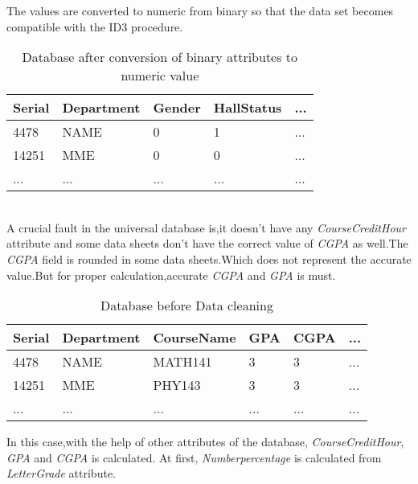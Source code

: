 The values are converted to numeric  from binary so that the data set becomes compatible with the ID3 procedure.
\begin {table}[H]
\caption {Database after conversion of binary attributes to numeric value} \label{tab:title}
\begin{center}
\begin{tabular}{ | m{1cm} |  m{2cm} | m{2cm} | m{2cm} |  m{0.5cm} | } 
\hline
Serial & Department &  Gender & HallStatus & ... \\ 
\hline
4478 & NAME & 0 & 1 & ... \\ 
\hline
14251 & MME & 0 & 0 & ... \\ 
\hline
... & ... & ... & ... & ... \\ 
\hline
\end{tabular}
\end{center}
\end{table}
\\ A crucial fault in the universal database is,it doesn't have any \textit{CourseCreditHour} attribute and some data sheets don't have the correct value of \textit{CGPA} as well.The \textit{CGPA} field is rounded in some data sheets.Which does not represent the accurate value.But for proper calculation,accurate \textit{CGPA} and \textit{GPA} is must.
\begin {table}[!H]
\caption {Database before Data cleaning} \label{tab:title}
\begin{center}
\begin{tabular}{ | m{1cm} |  m{2cm} | m{2.1cm} | m{2cm} | m{2cm} | m{0.5cm} | } 
\hline
Serial & Department &  CourseName & GPA & CGPA & ... \\ 
\hline
4478 & NAME & MATH141 & 3 & 3 & ... \\ 
\hline
14251 & MME & PHY143 & 3 & 3 & ... \\ 
\hline
... & ... & ... & ... & ... & ... \\ 
\hline
\end{tabular}
\end{center}
\end{table}
In this case,with the help of other attributes of the database, \textit{CourseCreditHour}, \textit{GPA} and \textit{CGPA} is calculated.\newline
At first, \textit{Numberpercentage} is calculated from \textit{LetterGrade} attribute.
